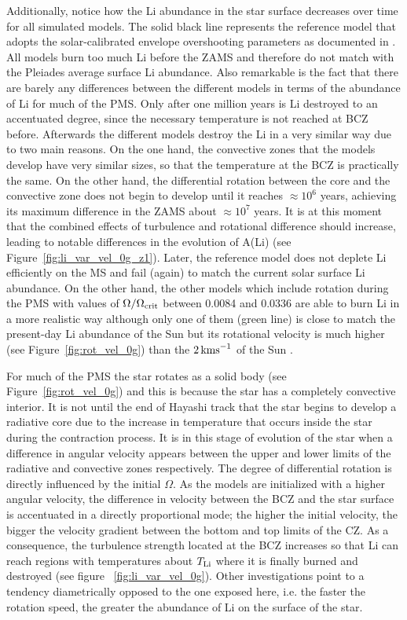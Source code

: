 \documentclass[fleqn,usenatbib]{mnras}
\begin{document}
{{Additionally, notice how the Li abundance in the star surface decreases over time for all simulated models. The solid black line represents the reference model that adopts the solar-calibrated envelope overshooting parameters as documented in \citet{Choi2016}. All models burn too much Li before the ZAMS and therefore do not match with the Pleiades average surface Li abundance. Also remarkable is the fact that there are barely any differences between the different models in terms of the abundance of Li for much of the PMS. Only after one million years is Li destroyed to an accentuated degree, since the necessary temperature is not reached at BCZ before. Afterwards the different models destroy the Li in a very similar way due to two main reasons. On the one hand, the convective zones that the models develop have very similar sizes, so that the temperature at the BCZ is practically the same. On the other hand, the differential rotation between the core and the convective zone does not begin to develop until it reaches $ \approx 10^6$ years, achieving its maximum difference in the ZAMS about $ \approx 10^7$ years. It is at this moment that the combined effects of turbulence and rotational difference should increase, leading to notable differences in the evolution of A(Li) (see Figure~\ref{fig:li_var_vel_0g_z1}). Later, the reference model does not deplete Li efficiently on the MS and fail (again) to match the current solar surface Li abundance. On the other hand, the other models which include rotation during the PMS with values of $\Omega / \Omega_{\mathrm{crit}}$ between 0.0084 and 0.0336 are able to burn Li in a more realistic way although only one of them (green line) is close to match the present-day Li abundance of the Sun but its rotational velocity is much higher (see Figure~\ref{fig:rot_vel_0g}) than the $2\,\mathrm{kms}^{-1}$ of the Sun \citep{Gill2012}. \par

For much of the PMS the star rotates as a solid body (see Figure~\ref{fig:rot_vel_0g}) and this is because the star has a completely convective interior. It is not until the end of Hayashi track that the star begins to develop a radiative core due to the increase in temperature that occurs inside the star during the contraction process. It is in this stage of evolution of the star when a difference in angular velocity appears between the upper and lower limits of the radiative and convective zones respectively. The degree of differential rotation is directly influenced by the initial $\Omega$. As the models are initialized with a higher angular velocity, the difference in velocity between the BCZ and the star surface is accentuated in a directly proportional mode; the higher the initial velocity, the bigger the velocity gradient between the bottom and top limits of the CZ. As a consequence, the turbulence strength located at the BCZ increases so that Li can reach regions with temperatures about $T_{\mathrm{Li}}$ where it is finally burned and destroyed (see figure~ \ref{fig:li_var_vel_0g}). Other investigations \citep{Bouvier2018, Baraffe2017}  point to a tendency diametrically opposed to the one exposed here, i.e. the faster the rotation speed, the greater the abundance of Li on the surface of the star. \par

}}
\end{document}
